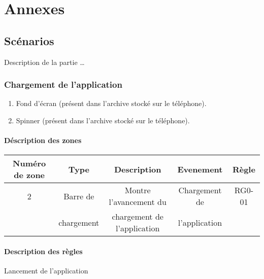 \documentclass{report}
\begin{document}
\chapter{Annexes}

	\section{Scénarios}
	
		Description de la partie \ldots
		
		\newpage

\newpage
	
	\subsection{Chargement de l'application}
	
		\hypertarget{Chargement de l'application}{}
		\label{Chargement de l'application}

		\begin{center}
			
		\end{center}
		
		\begin{enumerate}
		  \item Fond d'écran (présent dans l'archive stocké sur le téléphone).
		  \item Spinner (présent dans l'archive stocké sur le téléphone).
		\end{enumerate}
		
		\subsubsection{Déscription des zones}

			\begin{tabular}{|c|c|c|c|c|} \hline
				Numéro de zone & Type  & Description & Evenement &	Règle \\\hline 
				2 & Barre de & Montre l'avancement du & Chargement de & RG0-01\\
				  & chargement & chargement de l'application & l'application &\\\hline
			\end{tabular}
		
		\subsubsection{Description des règles}
		Lancement de l’application 
		
\end{document}
